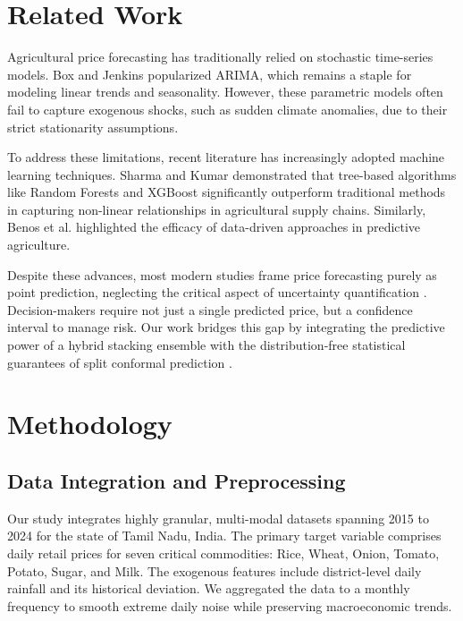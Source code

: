 \documentclass[conference]{IEEEtran}
\begin{document}
\section{Related Work}
\label{sec:related_work}
Agricultural price forecasting has traditionally relied on stochastic time-series models. Box and Jenkins \cite{box1970time} popularized ARIMA, which remains a staple for modeling linear trends and seasonality. However, these parametric models often fail to capture exogenous shocks, such as sudden climate anomalies, due to their strict stationarity assumptions.

To address these limitations, recent literature has increasingly adopted machine learning techniques. Sharma and Kumar \cite{sharma2022machine} demonstrated that tree-based algorithms like Random Forests \cite{breiman2001random} and XGBoost \cite{chen2016xgboost} significantly outperform traditional methods in capturing non-linear relationships in agricultural supply chains. Similarly, Benos et al. \cite{benos2021machine} highlighted the efficacy of data-driven approaches in predictive agriculture. 

Despite these advances, most modern studies frame price forecasting purely as point prediction, neglecting the critical aspect of uncertainty quantification \cite{mishra2023climate}. Decision-makers require not just a single predicted price, but a confidence interval to manage risk. Our work bridges this gap by integrating the predictive power of a hybrid stacking ensemble with the distribution-free statistical guarantees of split conformal prediction \cite{vovk2005algorithmic}.

\section{Methodology}
\label{sec:methodology}

\subsection{Data Integration and Preprocessing}
Our study integrates highly granular, multi-modal datasets spanning 2015 to 2024 for the state of Tamil Nadu, India. The primary target variable comprises daily retail prices for seven critical commodities: Rice, Wheat, Onion, Tomato, Potato, Sugar, and Milk. The exogenous features include district-level daily rainfall and its historical deviation. We aggregated the data to a monthly frequency to smooth extreme daily noise while preserving macroeconomic trends.
\end{document}
